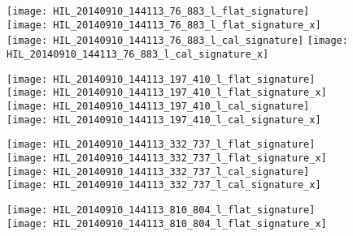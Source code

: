 \begin{figure*}[ht]
		\begin{subfigure}[t]{\columnwidth}
			\texttt{[image: HIL\_20140910\_144113\_76\_883\_l\_flat\_signature]}
			\texttt{[image: HIL\_20140910\_144113\_76\_883\_l\_flat\_signature\_x]}\\
			\texttt{[image: HIL\_20140910\_144113\_76\_883\_l\_cal\_signature]}
			\texttt{[image: HIL\_20140910\_144113\_76\_883\_l\_cal\_signature\_x]}
			\label{fig:pol_signatures:refl1}
		\end{subfigure}
		\begin{subfigure}[t]{\columnwidth}
			\texttt{[image: HIL\_20140910\_144113\_197\_410\_l\_flat\_signature]}
			\texttt{[image: HIL\_20140910\_144113\_197\_410\_l\_flat\_signature\_x]}\\
			\texttt{[image: HIL\_20140910\_144113\_197\_410\_l\_cal\_signature]}
			\texttt{[image: HIL\_20140910\_144113\_197\_410\_l\_cal\_signature\_x]}
			\label{fig:pol_signatures:refl2}
		\end{subfigure}
		\begin{subfigure}[t]{\columnwidth}
			\texttt{[image: HIL\_20140910\_144113\_332\_737\_l\_flat\_signature]}
			\texttt{[image: HIL\_20140910\_144113\_332\_737\_l\_flat\_signature\_x]}\\
			\texttt{[image: HIL\_20140910\_144113\_332\_737\_l\_cal\_signature]}
			\texttt{[image: HIL\_20140910\_144113\_332\_737\_l\_cal\_signature\_x]}
			\label{fig:pol_signatures:refl3}
		\end{subfigure}
		\begin{subfigure}[t]{\columnwidth}
			\texttt{[image: HIL\_20140910\_144113\_810\_804\_l\_flat\_signature]}
			\texttt{[image: HIL\_20140910\_144113\_810\_804\_l\_flat\_signature\_x]}\\

\end{subfigure}
\end{figure*}
